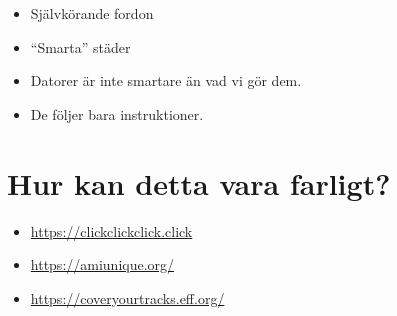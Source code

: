 
\begin{frame}
  \begin{example}
    \begin{itemize}
      \item Självkörande fordon
      \item \enquote{Smarta} städer
    \end{itemize}
  \end{example}

  \pause

  \begin{remark}
    \begin{itemize}
      \item Datorer är inte smartare än vad vi gör dem.
      \item De följer bara instruktioner.
    \end{itemize}
  \end{remark}
\end{frame}


\section{Hur kan detta vara farligt?}




\begin{frame}
  \begin{example}
    \begin{itemize}
      \item \url{https://clickclickclick.click}
      \item \url{https://amiunique.org/}
      \item \url{https://coveryourtracks.eff.org/}
    \end{itemize}
  \end{example}
\end{frame}

